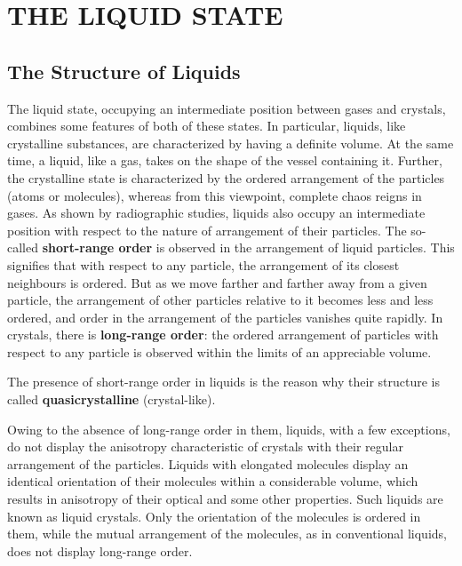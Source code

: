 

\chapter{THE LIQUID STATE}\label{chap:14}

\section{The Structure of Liquids}\label{sec:14_1}

The liquid state, occupying an intermediate position between gases and crystals, combines some features of both of these states. In particular, liquids, like crystalline substances, are characterized by having a definite volume. At the same time, a liquid, like a gas, takes on the shape of the vessel containing it. Further, the crystalline state is characterized by the ordered arrangement of the particles (atoms or molecules), whereas from this viewpoint, complete chaos reigns in gases. As shown by radiographic studies, liquids also occupy an intermediate position with respect to the nature of arrangement of their particles. The so-called \textbf{short-range order} is observed in the arrangement of liquid particles. This signifies that with respect to any particle, the arrangement of its closest neighbours is ordered. But as we move farther and farther away from a given particle, the arrangement of other particles relative to it becomes less and less ordered, and order in the arrangement of the particles vanishes quite rapidly. In crystals, there is \textbf{long-range order}: the ordered arrangement of particles with respect to any particle is observed within the limits of an appreciable volume.

The presence of short-range order in liquids is the reason why their structure is called \textbf{quasicrystalline} (crystal-like).

Owing to the absence of long-range order in them, liquids, with a few exceptions, do not display the anisotropy characteristic of crystals with their regular arrangement of the particles. Liquids with elongated molecules display an identical orientation of their molecules within a considerable volume, which results in anisotropy of their optical and some other properties. Such liquids are known as liquid crystals. Only the orientation of the molecules is ordered in them, while the mutual arrangement of the molecules, as in conventional liquids, does not display long-range order.

